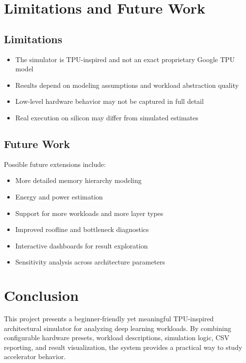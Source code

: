 \documentclass[12pt,a4paper]{article}
\begin{document}
	\section{Limitations and Future Work}
	
	\subsection{Limitations}
	\begin{itemize}[itemsep=2pt, topsep=4pt]
		\item The simulator is TPU-inspired and not an exact proprietary Google TPU model
		\item Results depend on modeling assumptions and workload abstraction quality
		\item Low-level hardware behavior may not be captured in full detail
		\item Real execution on silicon may differ from simulated estimates
	\end{itemize}
	
	\subsection{Future Work}
	Possible future extensions include:
	\begin{itemize}[itemsep=2pt, topsep=4pt]
		\item More detailed memory hierarchy modeling
		\item Energy and power estimation
		\item Support for more workloads and more layer types
		\item Improved roofline and bottleneck diagnostics
		\item Interactive dashboards for result exploration
		\item Sensitivity analysis across architecture parameters
	\end{itemize}
	
	\section{Conclusion}
	This project presents a beginner-friendly yet meaningful TPU-inspired architectural simulator for analyzing deep learning workloads. By combining configurable hardware presets, workload descriptions, simulation logic, CSV reporting, and result visualization, the system provides a practical way to study accelerator behavior.
	
\end{document}
